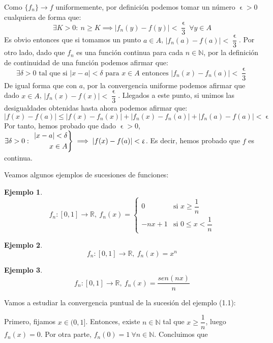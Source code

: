 \documentclass[11pt, a4paper]{article}
\makeatletter
\newif\IfInSansMode
\let\oldsf\sffamily
\renewcommand*{\sffamily}{\oldsf\mathversion{sans}\InSansModetrue}
\let\oldnorm\normalfont
\renewcommand*{\normalfont}{\oldnorm\InSansModefalse\mathversion{normal}}
\let\epsilon\upvarepsilon
\providecommand{\abs}[1]{\lvert#1\rvert}
\newcommand{\R}{\mathbb{R}} \newcommand{\N}{\mathbb{N}}
\newcommand{\fn}{\{f_n\}}
\renewenvironment{proof}[1][\proofname] {\par\pushQED{\qed}\normalfont\topsep6\p@\@plus6\p@\relax\trivlist\item[\hskip\labelsep\itshape\sffamily#1\@addpunct{.}]\ignorespaces}{\popQED\endtrivlist\@endpefalse}
\theoremstyle{theorem-style}
\theoremstyle{definition-style}
\theoremstyle{remark-style}
\theoremstyle{example-style}
\newtheorem{ejemplo}{Ejemplo}[section]
\newenvironment{rcases}
{\left.\begin{aligned}}
    {\end{aligned}\right\rbrace}
\makeatother
\begin{document}
\begin{proof}
  Como $\fn \to f$ uniformemente, por definición podemos tomar un número $\epsilon > 0$ cualquiera de forma que:
  \[ \exists K>0:\ n\ge K \implies \abs{f_n(y)-f(y)}<\dfrac{\epsilon}{3}\ \forall y\in A \]
    Es obvio entonces que si tomamos un punto $a \in A$, $\abs{f_n(a)-f(a)}<\dfrac{\epsilon}{3}$. Por otro lado, dado que $f_n$ es una función continua para cada $n \in \N$, por la definición de continuidad de una función podemos afirmar que:
    $$\exists \delta > 0 \text{ tal que si } |x-a| < \delta \text{ para } x \in A \text{ entonces } \abs{f_n(x)-f_n(a)} < \dfrac{\epsilon}{3}$$
    De igual forma que con $a$, por la convergencia uniforme podemos afirmar que dado $x \in A$, $\abs{f_n(x)-f(x)}<\dfrac{\epsilon}{3}$.
    Llegados a este punto, si unimos las desigualdades obtenidas hasta ahora podemos afirmar que:
    $$ \abs{f(x)-f(a)} \le \abs{f(x)-f_n(x)} + \abs{f_n(x)-f_n(a)}+\abs{f_n(a)-f(a)} < \epsilon $$  
  Por tanto, hemos probado que dado $\epsilon > 0$, \ $\exists \delta>0:\ \begin{rcases}
    \abs{x-a}<\delta\\
    x\in A
  \end{rcases} \implies \abs{f(x)-f(a)}<\epsilon$. Es decir, hemos probado que $f$ es continua. 
\end{proof}

Veamos algunos ejemplos de sucesiones de funciones:

\begin{ejemplo}
  \[
    f_n : [0,1] \to \R,\ f_n(x) = \begin{cases}
      0 & \text{si } x\ge \dfrac{1}{n}\\
      -nx+1 & \text{si } 0\le x < \dfrac{1}{n}
    \end{cases}
  \]
\end{ejemplo}

\begin{ejemplo}
  \[
    f_n : [0,1] \to \R,\ f_n(x) = x^n
  \]
\end{ejemplo}

\begin{ejemplo}
  \[
    f_n : [0,1] \to \R,\ f_n(x) = \dfrac{sen(nx)}{n}
  \]
\end{ejemplo}


Vamos a estudiar la convergencia puntual de la sucesión del ejemplo (1.1):

Primero, fijamos $x\in (0,1]$. Entonces, existe $n\in \N$ tal que $x \ge \dfrac{1}{n}$, luego $f_n(x) = 0$. Por otra parte, $f_n(0) = 1\ \forall n\in \N$. Concluimos que
\end{document}

